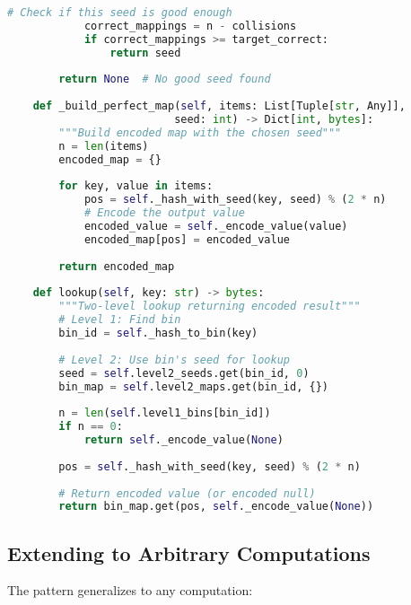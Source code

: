 \begin{lstlisting}[language=Python, caption={Two-level perfect hashing for Bernoulli maps}]
            # Check if this seed is good enough
            correct_mappings = n - collisions
            if correct_mappings >= target_correct:
                return seed
        
        return None  # No good seed found
    
    def _build_perfect_map(self, items: List[Tuple[str, Any]], 
                          seed: int) -> Dict[int, bytes]:
        """Build encoded map with the chosen seed"""
        n = len(items)
        encoded_map = {}
        
        for key, value in items:
            pos = self._hash_with_seed(key, seed) % (2 * n)
            # Encode the output value
            encoded_value = self._encode_value(value)
            encoded_map[pos] = encoded_value
        
        return encoded_map
    
    def lookup(self, key: str) -> bytes:
        """Two-level lookup returning encoded result"""
        # Level 1: Find bin
        bin_id = self._hash_to_bin(key)
        
        # Level 2: Use bin's seed for lookup
        seed = self.level2_seeds.get(bin_id, 0)
        bin_map = self.level2_maps.get(bin_id, {})
        
        n = len(self.level1_bins[bin_id])
        if n == 0:
            return self._encode_value(None)
        
        pos = self._hash_with_seed(key, seed) % (2 * n)
        
        # Return encoded value (or encoded null)
        return bin_map.get(pos, self._encode_value(None))
\end{lstlisting}

\subsection{Extending to Arbitrary Computations}

The pattern generalizes to any computation:

